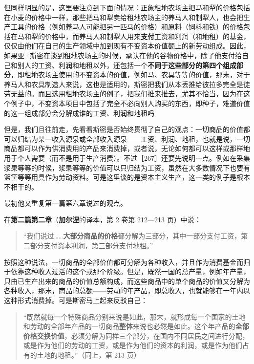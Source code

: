 但同样明显的是，这里要注意到下面的情况：正象租地农场主把马和犁的价格包括在小麦的价格中一样，那些把马和犁卖给租地农场主的养马人和制犁人，也会把生产工具的价格（例如养马人可能把另一匹马的价格）和原料（饲料和铁）的价格包括在马和犁的价格中，而养马人和制犁人用来\textbf{支付}工资和利润（和地租）的基金，仅仅由他们在自己的生产领域中加到现有不变资本价值额上的新劳动组成。因此，如果亚·斯密在谈到租地农场主的时候，承认在他的谷物价格中，除了他支付给自己和别人的工资、利润和地租以外，还包括一个\textbf{不同于这些部分的第四个组成部分}，即租地农场主使用的不变资本的价值，例如马、农具等等的价值，那末，对于养马人和农具制造人来说，这也是适用的，斯密把我们从本丢推给彼拉多完全是徒劳无益的。而且选用租地农场主的例子，把我们推来推去，尤其不恰当，因为在这个例子中，不变资本项目中包括了完全不必向别人购买的东西，即种子，难道价值的这一组成部分会分解成谁的工资、利润和地租吗

但是，我们且往前走，先看看斯密是否始终贯彻了自己的观点：一切商品的价值都可以归结为某一收入源泉或全部收入源泉——工资、利润、地租，也就是说，一切商品都可以作为供消费用的产品来消费掉，或者说，无论如何都可以这样或那样地用于个人需要（而不是用于生产消费）。不过［267］还要先说明一点。例如在采集浆果等等的时候，浆果等等的价值可以只归结为工资，虽然在大多数情况下也要有篮筐等等用具作为劳动资料。可是这里谈的是资本主义生产，这一类的例子是根本不相干的。

最初他又重复第一篇第六章说过的观点。

在\textbf{第二篇第二章}（\textbf{加尔涅}的译本，第 2 卷第 212—213 页）中说：

\begin{quote}“我们说过……\textbf{大部分商品的价格}都分解为三部分，其中一部分支付工资，第二部分支付资本利润，第三部分支付地租。”\end{quote}

按照这种说法，一切商品的全部价值都可分解为各种收入，并且作为消费基金而归于依靠这种收入过活的这个或那个阶级。但是，既然一国的总产量，例如年产量，只由已生产出来的商品的价值总额构成，而这些商品中的单个商品的价值又分解为各种收入，那末，商品的总额——劳动的年产品，即总收入，也就能够在一年内以这种形式消费掉。可是斯密马上起来反驳自己：

\begin{quote}“既然就每一个特殊商品分别来说是如此，那末，就形成每一个国家的土地和劳动的全部年产品的一切商品\textbf{整体}来说也必然是如此。这个年产品的\textbf{全部价格交换价值}，必须分解为同样三个部分，在国内不同居民之间进行分配，或是作为他们的劳动的工资，或是作为他们的资本的利润，或是作为他们占有的土地的地租。”（同上，第 213 页）\end{quote}

